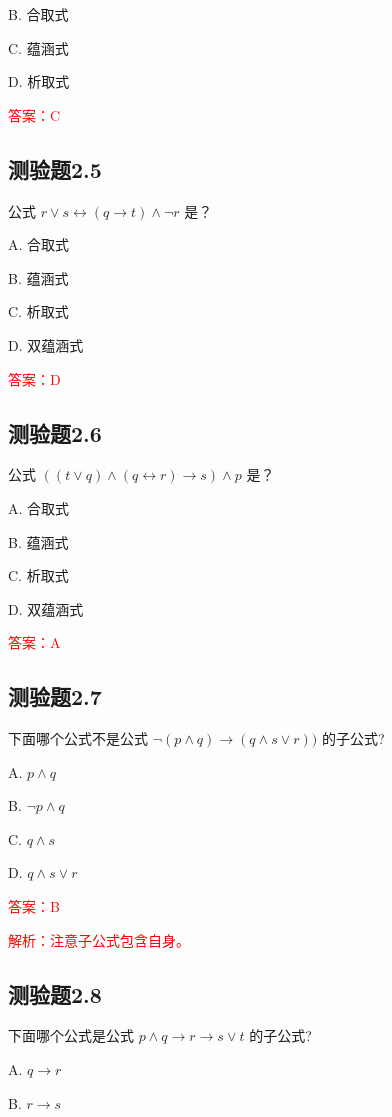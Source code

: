 \documentclass[UTF8, heading=true]{ctexart}
\begin{document}
B. 合取式

C. 蕴涵式

D. 析取式

\textcolor{red}{答案：C}

\subsection{测验题2.5}

公式 $r \vee s \leftrightarrow(q \rightarrow t) \wedge \neg r$ 是？

A. 合取式

B. 蕴涵式

C. 析取式

D. 双蕴涵式

\textcolor{red}{答案：D}

\subsection{测验题2.6}

公式 $((t \vee q) \wedge(q \leftrightarrow r) \rightarrow s) \wedge p$ 是？

A. 合取式

B. 蕴涵式

C. 析取式

D. 双蕴涵式

\textcolor{red}{答案：A}

\subsection{测验题2.7}

下面哪个公式不是公式 $\neg(p \wedge q) \rightarrow(q \wedge s \vee r))$ 的子公式? $\qquad$

A. $
p \wedge q
$

B. $
\neg p \wedge q
$

C. $
q \wedge s
$

D. $
q \wedge s \vee r
$

\textcolor{red}{答案：B}

\textcolor{red}{解析：注意子公式包含自身。}

\subsection{测验题2.8}

下面哪个公式是公式 $p \wedge q \rightarrow r \rightarrow s \vee t$ 的子公式?

A. $q \rightarrow r$

B. $r \rightarrow s$
\end{document}
